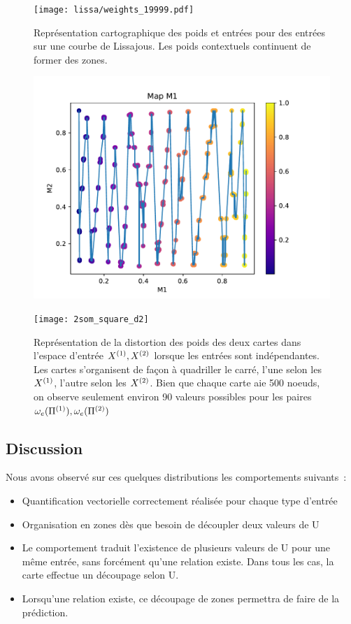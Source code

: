 \documentclass[../main]{subfiles}
\begin{document}
\begin{figure}
	\centering\texttt{[image: lissa/weights\_19999.pdf]}
	\caption{Représentation cartographique des poids et entrées pour des entrées sur une courbe de Lissajous. Les poids contextuels continuent de former des zones.}
\end{figure}

\begin{figure}
	\begin{minipage}{0.48\textwidth}
		\includegraphics[width=\textwidth]{2som_square_d}
	\end{minipage}
	\begin{minipage}{0.48\textwidth}
		\texttt{[image: 2som\_square\_d2]}
	\end{minipage}
	\caption{Représentation de la distortion des poids des deux cartes dans l'espace d'entrée $X^{({1})}, X^{({2})}$ lorsque les entrées sont indépendantes. Les cartes s'organisent de façon à quadriller le carré, l'une selon les $X^{({1})}$, l'autre selon les $X^{({2})}$. Bien que chaque carte aie 500 noeuds, on observe seulement environ 90 valeurs possibles pour les paires $\omega_e(\Pi^{({1})}),\omega_e(\Pi^{({2})})$ \label{2som_p_d}}
\end{figure}

\subsection{Discussion}

Nous avons observé sur ces quelques distributions les comportements suivants~:
\begin{itemize}
	\item Quantification vectorielle correctement réalisée pour chaque type d'entrée
	\item Organisation en zones dès que besoin de découpler deux valeurs de U
	\item Le comportement traduit l'existence de plusieurs valeurs de U pour une même entrée, sans forcément qu'une relation existe. Dans tous les cas, la carte effectue un découpage selon U.
	\item Lorsqu'une relation existe, ce découpage de zones permettra de faire de la prédiction.
\end{itemize}
\end{document}
